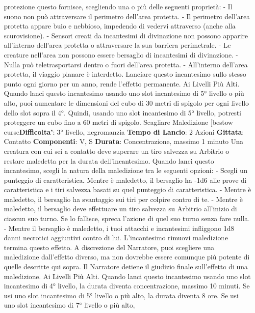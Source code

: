 \begin{multicols}{2}
protezione questo fornisce, scegliendo una o più delle
seguenti proprietà:
- Il suono non può attraversare il perimetro dell’area
protetta.
- Il perimetro dell’area protetta appare buio e
nebbioso, impedendo di vedervi attraverso (anche
alla scurovisione).
- Sensori creati da incantesimi di divinazione non
possono apparire all’interno dell’area protetta o
attraversare la sua barriera perimetrale.
- Le creature nell’area non possono essere bersaglio
di incantesimi di divinazione.
- Nulla può teletrasportarsi dentro o fuori dell’area
protetta.
- All’interno dell’area protetta, il viaggio planare è
interdetto.
Lanciare questo incantesimo sullo stesso punto ogni
giorno per un anno, rende l’effetto permanente.
Ai Livelli Più Alti. Quando lanci questo incantesimo
usando uno slot incantesimo di 5° livello o più alto, puoi
aumentare le dimensioni del cubo di 30 metri di spigolo
per ogni livello dello slot sopra il 4°. Quindi, usando uno
slot incantesimo di 5° livello, potresti proteggere un
cubo fino a 60 metri di spigolo.
Scagliare Maledizione
[bestow curse\textbf{Difficolta'}:
3° livello, negromanzia
\textbf{Tempo di Lancio}: 2 Azioni
\textbf{Gittata}: Contatto
\textbf{Componenti}: V, S
\textbf{Durata}: Concentrazione, massimo 1 minuto
Una creatura con cui sei a contatto deve superare un
tiro salvezza su Arbitrio o restare maledetta per la
durata dell’incantesimo. Quando lanci questo
incantesimo, scegli la natura della maledizione tra le
seguenti opzioni:
- Scegli un punteggio di caratteristica. Mentre è
maledetto, il bersaglio ha -1d6 alle prove di
caratteristica e i tiri salvezza basati su quel
punteggio di caratteristica.
- Mentre è maledetto, il bersaglio ha svantaggio sui
tiri per colpire contro di te.
- Mentre è maledetto, il bersaglio deve effettuare un
tiro salvezza su Arbitrio all’inizio di ciascun suo
turno. Se lo fallisce, spreca l’azione di quel suo
turno senza fare nulla.
- Mentre il bersaglio è maledetto, i tuoi attacchi e
incantesimi infliggono 1d8 danni necrotici aggiuntivi
contro di lui.
L’incantesimo rimuovi maledizione termina questo
effetto. A discrezione del Narratore, puoi scegliere una
maledizione dall’effetto diverso, ma non dovrebbe
essere comunque più potente di quelle descritte qui
sopra. Il Narratore detiene il giudizio finale sull’effetto di una
maledizione.
Ai Livelli Più Alti. Quando lanci questo incantesimo
usando uno slot incantesimo di 4° livello, la durata
diventa concentrazione, massimo 10 minuti. Se usi uno
slot incantesimo di 5° livello o più alto, la durata diventa
8 ore. Se usi uno slot incantesimo di 7° livello o più alto,

\end{multicols}
